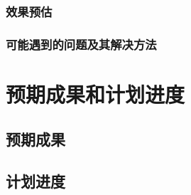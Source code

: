 \subsubsection{效果预估}
\subsubsection{可能遇到的问题及其解决方法}


\section{预期成果和计划进度}

\subsection{预期成果}
\subsection{计划进度}


\nocite{*}%
